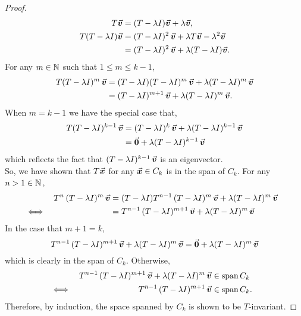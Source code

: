 \documentclass[../MathsNotesBase.tex]{subfiles}
\begin{document}
{\begin{proof}
			\[\begin{aligned}
				T\vec{\bm{v}} &= (T - \lambda I) \vec{\bm{v}} + \lambda \vec{\bm{v}}, \\
				T(T - \lambda I) \vec{\bm{v}} &= (T - \lambda I)^2 \, \vec{\bm{v}} + \lambda T\vec{\bm{v}} - \lambda^2 \vec{\bm{v}} \\
									&= (T - \lambda I)^2 \, \vec{\bm{v}} + \lambda (T - \lambda I) \vec{\bm{v}}. \\
			\end{aligned}\]
			For any ${ m \in \mathbb{N}^{} }$ such that ${ 1 \leq m \leq k-1 }$,
			\[\begin{aligned}
				T(T - \lambda I)^m\,\vec{\bm{v}} &= (T - \lambda I)(T - \lambda I)^m\,\vec{\bm{v}} + \lambda (T - \lambda I)^m\,\vec{\bm{v}} \\
				&= (T - \lambda I)^{m+1}\,\vec{\bm{v}} + \lambda (T - \lambda I)^m\,\vec{\bm{v}}.\\
			\end{aligned}\]
			When ${ m = k-1 }$ we have the special case that,
			\[\begin{aligned}
				T(T - \lambda I)^{k-1}\,\vec{\bm{v}} &= (T - \lambda I)^k\,\vec{\bm{v}} + \lambda (T - \lambda I)^{k-1}\,\vec{\bm{v}} \\
				&= \vec{\bm{0}} + \lambda (T - \lambda I)^{k-1}\,\vec{\bm{v}} \\
			\end{aligned}\]
			which reflects the fact that ${ (T - \lambda I)^{k-1}\,\vec{\bm{v}} }$ is an eigenvector.\\
			
			So, we have shown that $T\vec{\bm{x}}$ for any ${ \vec{\bm{x}} \in C_k }$ is in the span of $C_k$. For any ${ n > 1 \in \mathbb{N}^{} }$,
			\[\begin{aligned}
				&& T^n\,(T - \lambda I)^m\,\vec{\bm{v}} &= (T - \lambda I)T^{n-1}\,(T - \lambda I)^m\,\vec{\bm{v}} + \lambda (T - \lambda I)^m\,\vec{\bm{v}} \\
				&\iff &  &= T^{n-1}\,(T - \lambda I)^{m+1}\,\vec{\bm{v}} + \lambda (T - \lambda I)^m\,\vec{\bm{v}} &\text{\scriptsize{}} \\
			\end{aligned}\]
			In the case that ${ m + 1 = k }$,
			\[ T^{n-1}\,(T - \lambda I)^{m+1}\,\vec{\bm{v}} + \lambda (T - \lambda I)^m\,\vec{\bm{v}} = \vec{\bm{0}} + \lambda (T - \lambda I)^m\,\vec{\bm{v}} \]
			which is clearly in the span of $C_k$. Otherwise, 
			\[\begin{aligned}
				&& T^{n-1}\,(T - \lambda I)^{m+1}\,\vec{\bm{v}} + \lambda (T - \lambda I)^m\,\vec{\bm{v}} &\in \operatorname{span} C_k \\
				&\iff &  T^{n-1}\,(T - \lambda I)^{m+1}\,\vec{\bm{v}} &\in \operatorname{span} C_k. &\text{\scriptsize{}} \\
			\end{aligned}\]
			Therefore, by induction, the space spanned by $C_k$ is shown to be $T$-invariant.
		\end{proof}

}
\end{document}
